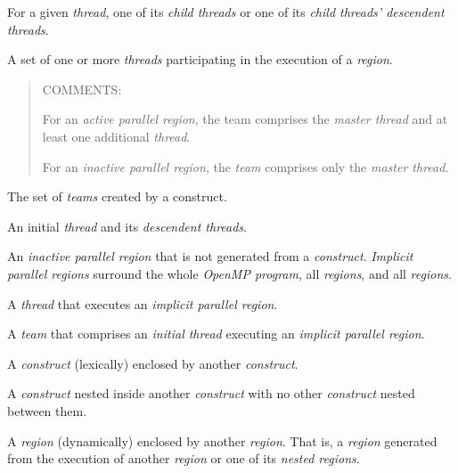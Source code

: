 \glossarydefstart
For a given \emph{thread}, one of its \emph{child threads} or one of
its \emph{child threads' descendent threads}.
\glossarydefend

\glossarydefstart
A set of one or more \emph{threads} participating in the execution of a 
\emph{region}.

\begin{quote}
COMMENTS:

For an \emph{active parallel region}, the team comprises the \emph{master thread}
and at least one additional \emph{thread}.

For an \emph{inactive parallel region}, the \emph{team} comprises only the \emph{master thread}.
\end{quote}
\glossarydefend

\glossarydefstart
The set of \emph{teams} created by a  construct.
\glossarydefend

\glossarydefstart
An initial \emph{thread} and its \emph{descendent threads}.
\glossarydefend

\glossarydefstart
An \emph{inactive parallel region} that is not generated from a
 \emph{construct}. \emph{Implicit parallel regions} surround the whole
\emph{OpenMP program}, all  \emph{regions}, and all 
\emph{regions}.

\glossarydefend

\glossarydefstart
A \emph{thread} that executes an \emph{implicit parallel region}.
\glossarydefend

\glossarydefstart
A \emph{team} that comprises an \emph{initial thread} executing an \emph{implicit parallel region}.
\glossarydefend

\glossarydefstart
A \emph{construct} (lexically) enclosed by another \emph{construct}.
\glossarydefend

\glossarydefstart
A \emph{construct} nested inside another \emph{construct} with no other \emph{construct} nested
between them.
\glossarydefend

\glossarydefstart
A \emph{region} (dynamically) enclosed by another \emph{region}.  That is, a
\emph{region} generated from the execution of another \emph{region}
or one of its \emph{nested regions}.

